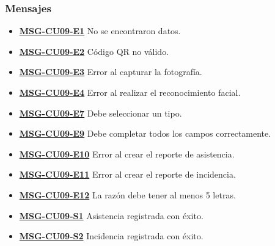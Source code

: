\subsubsection{Mensajes}
\begin{itemize}
	\item \textbf{\hyperref[msg:CU09-E1]{MSG-CU09-E1}} No se encontraron datos.
	\item \textbf{\hyperref[msg:CU09-E2]{MSG-CU09-E2}} Código QR no válido.
	\item \textbf{\hyperref[msg:CU09-E3]{MSG-CU09-E3}} Error al capturar la fotografía.
	\item \textbf{\hyperref[msg:CU09-E4]{MSG-CU09-E4}} Error al realizar el reconocimiento facial.
	\item \textbf{\hyperref[msg:CU09-E7]{MSG-CU09-E7}} Debe seleccionar un tipo.
	\item \textbf{\hyperref[msg:CU09-E9]{MSG-CU09-E9}} Debe completar todos los campos correctamente.
	\item \textbf{\hyperref[msg:CU09-E10]{MSG-CU09-E10}} Error al crear el reporte de asistencia.
	\item \textbf{\hyperref[msg:CU09-E11]{MSG-CU09-E11}} Error al crear el reporte de incidencia.
	\item \textbf{\hyperref[msg:CU09-E12]{MSG-CU09-E12}} La razón debe tener al menos 5 letras.
	\item \textbf{\hyperref[msg:CU09-S1]{MSG-CU09-S1}} Asistencia registrada con éxito.
	\item \textbf{\hyperref[msg:CU09-S2]{MSG-CU09-S2}} Incidencia registrada con éxito.
\end{itemize}
